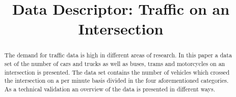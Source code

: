 \documentclass[conference]{IEEEtran}
\begin{document}
\title{Data Descriptor: Traffic on an Intersection\\
}

\author{
\and
{}
}
\maketitle
\begin{abstract}
The demand for traffic data is high in different areas of research. In this paper a data set of the number of cars and trucks as well as buses, trams and motorcycles on an intersection is presented. The data set contains the number of vehicles which crossed the intersection on a per minute basis divided in the four aforementioned categories. As a technical validation an overview of the data is presented in different ways.
\end{abstract}






%







\end{document}
